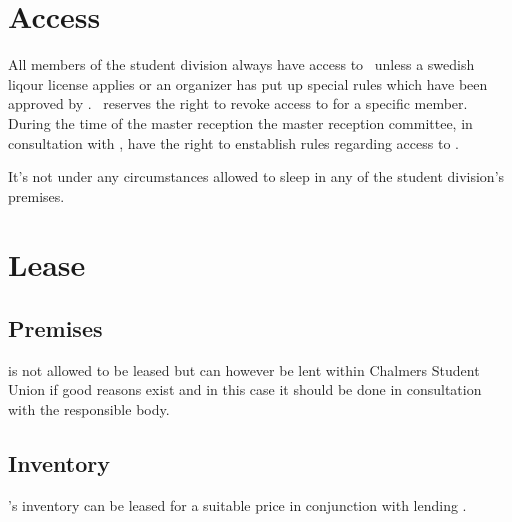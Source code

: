 \documentclass[11pt, includeaddress]{classes/cthit_en}
\begin{document}
\section{Access}
All members of the student division always have access to \THECLOUD\ unless a swedish liqour license applies or an organizer has put up special rules which have been approved by \STYRIT.
\STYRIT\ reserves the right to revoke access to \THECLOUD{} for a specific member.
During the time of the master reception the master reception committee, in consultation with \STYRIT, have the right to enstablish rules regarding access to \THECLOUD.

It's not under any circumstances allowed to sleep in any of the student division's premises.



\section{Lease}
\subsection{Premises}
\THECLOUD is not allowed to be leased but can however be lent within Chalmers Student Union if good reasons exist and in this case it should be done in consultation with the responsible body.

\subsection{Inventory}
\THECLOUD's inventory can be leased for a suitable price in conjunction with lending \THECLOUD.
\end{document}
